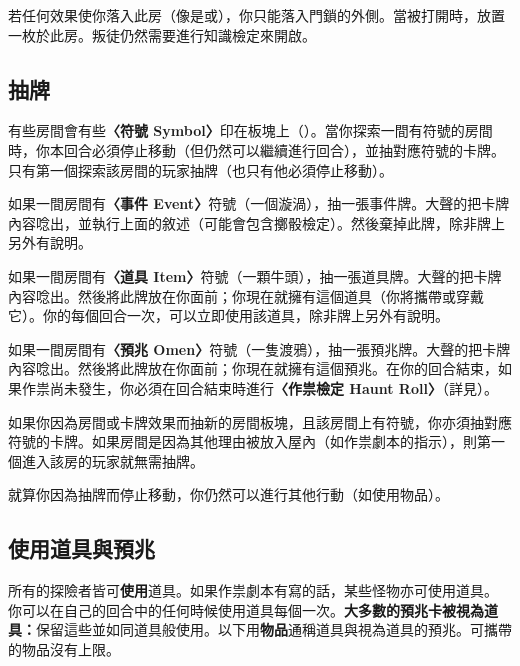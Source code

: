 \begin{RuleBox}{}
  若任何效果使你落入此房（像是或），你只能落入門鎖的外側。當被打開時，放置一枚於此房。叛徒仍然需要進行知識檢定來開啟。
\end{RuleBox}


\subsection{抽牌} \label{ssec:draw}

有些房間會有些\textbf{〈符號 Symbol〉}印在板塊上（\EventSymbol{}\ItemSymbol{}\OmenSymbol{}）。當你探索一間有符號的房間時，你本回合必須停止移動（但仍然可以繼續進行回合），並抽對應符號的卡牌。只有第一個探索該房間的玩家抽牌（也只有他必須停止移動）。

如果一間房間有\textbf{〈事件 Event〉}符號（一個漩渦\EventSymbol{}），抽一張事件牌。大聲的把卡牌內容唸出，並執行上面的敘述（可能會包含擲骰檢定）。然後棄掉此牌，除非牌上另外有說明。

如果一間房間有\textbf{〈道具 Item〉}符號（一顆牛頭\ItemSymbol{}），抽一張道具牌。大聲的把卡牌內容唸出。然後將此牌放在你面前；你現在就擁有這個道具（你將攜帶或穿戴它）。你的每個回合一次，可以立即使用該道具，除非牌上另外有說明。

如果一間房間有\textbf{〈預兆 Omen〉}符號（一隻渡鴉\OmenSymbol{}），抽一張預兆牌。大聲的把卡牌內容唸出。然後將此牌放在你面前；你現在就擁有這個預兆。在你的回合結束，如果作祟尚未發生，你必須在回合結束時進行\textbf{〈作祟檢定 Haunt Roll〉}（詳見）。

如果你因為房間或卡牌效果而抽新的房間板塊，且該房間上有符號，你亦須抽對應符號的卡牌。如果房間是因為其他理由被放入屋內（如作祟劇本的指示），則第一個進入該房的玩家就無需抽牌。

就算你因為抽牌而停止移動，你仍然可以進行其他行動（如使用物品）。


\subsection{使用道具與預兆}

所有的探險者皆可\textbf{使用}道具。如果作祟劇本有寫的話，某些怪物亦可使用道具。
你可以在自己的回合中的任何時候使用道具每個一次。\textbf{大多數的預兆卡被視為道具：}保留這些並如同道具般使用。以下用\textbf{物品}通稱道具與視為道具的預兆。可攜帶的物品沒有上限。

